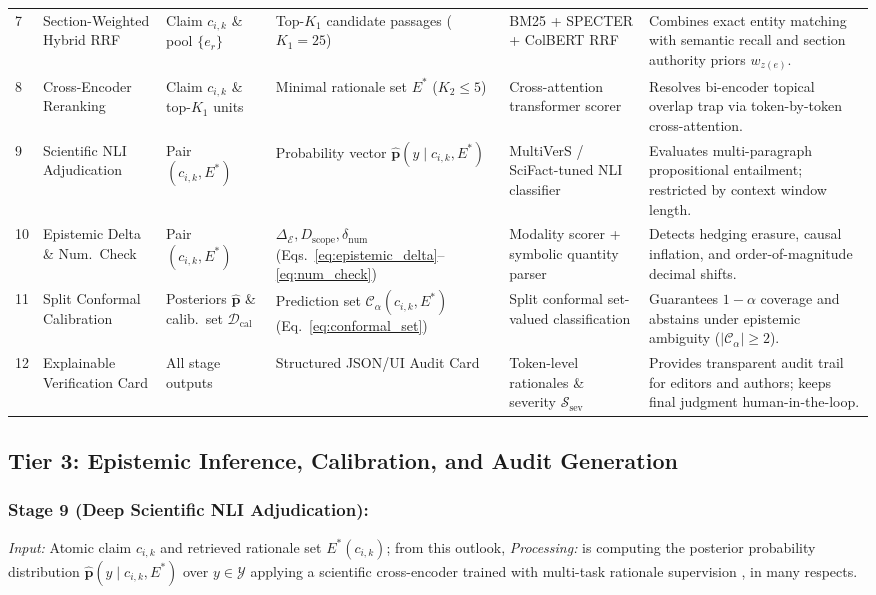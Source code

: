 \documentclass[sigconf]{acmart}
\begin{document}
\begin{table}[t]
\begin{tabularx}{\textwidth}{C{0.5cm} L{2.5cm} L{2.3cm} L{2.4cm} L{3.2cm} Y}
7 & Section-Weighted Hybrid RRF & Claim $c_{i,k}$ \& pool $\{e_r\}$ & Top-$K_1$ candidate passages ($K_1=25$) & BM25 \cite{robertson2009probabilistic} + SPECTER \cite{cohan2020specter} + ColBERT \cite{khattab2020colbert} RRF \cite{cormack2009reciprocal} & Combines exact entity matching with semantic recall and section authority priors $w_{z(e)}$. \\
8 & Cross-Encoder Reranking & Claim $c_{i,k}$ \& top-$K_1$ units & Minimal rationale set $E^*$ ($K_2 \leq 5$) & Cross-attention transformer scorer \cite{wadden2022multivers} & Resolves bi-encoder topical overlap trap via token-by-token cross-attention. \\
9 & Scientific NLI Adjudication & Pair $(c_{i,k}, E^*)$ & Probability vector $\hat{\mathbf{p}}(y \mid c_{i,k}, E^*)$ & MultiVerS / SciFact-tuned NLI classifier \cite{wadden2020fact,wadden2022multivers} & Evaluates multi-paragraph propositional entailment; restricted by context window length. \\
10 & Epistemic Delta \& Num.\ Check & Pair $(c_{i,k}, E^*)$ & $\Delta_{\mathcal{E}}, D_{\text{scope}}, \delta_{\text{num}}$ (Eqs.~\ref{eq:epistemic_delta}--\ref{eq:num_check}) & Modality scorer \cite{hyland1998hedging} + symbolic quantity parser \cite{lu2023scitab} & Detects hedging erasure, causal inflation, and order-of-magnitude decimal shifts. \\
11 & Split Conformal Calibration & Posteriors $\hat{\mathbf{p}}$ \& calib.\ set $\mathcal{D}_{\text{cal}}$ & Prediction set $\mathcal{C}_{\alpha}(c_{i,k}, E^*)$ (Eq.~\ref{eq:conformal_set}) & Split conformal set-valued classification \cite{sadinle2019least,angelopoulos2023conformal} & Guarantees $1-\alpha$ coverage and abstains under epistemic ambiguity ($|\mathcal{C}_{\alpha}| \geq 2$). \\
12 & Explainable Verification Card & All stage outputs & Structured JSON/UI Audit Card & Token-level rationales \cite{rashkin2023measuring,gao2023enabling} \& severity $\mathcal{S}_{\text{sev}}$ & Provides transparent audit trail for editors and authors; keeps final judgment human-in-the-loop. \\
\bottomrule
\end{tabularx}
\end{table}

\subsection{Tier 3: Epistemic Inference, Calibration, and Audit Generation}
\subsubsection{Stage 9 (Deep Scientific NLI Adjudication):}
\emph{Input:} Atomic claim $c_{i,k}$ and retrieved rationale set $E^*(c_{i,k})$; from this outlook, \emph{Processing:} is computing the posterior probability distribution $\hat{\mathbf{p}}(y \mid c_{i,k}, E^*)$ over $y \in \mathcal{Y}$ applying a scientific cross-encoder trained with multi-task rationale supervision \cite{wadden2020fact,wadden2022multivers}, in many respects.
\end{document}
